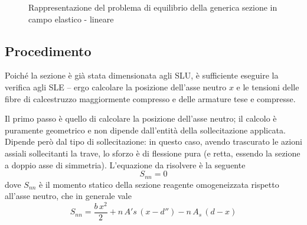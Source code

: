 \begin{figure}
{}
	\caption{Rappresentazione del problema di equilibrio della generica sezione in campo elastico - lineare}
	\label{fig:equilibrioSezioneSLE}
\end{figure}

\subsection{Procedimento}
Poiché la sezione è già stata dimensionata agli SLU, è sufficiente eseguire la verifica agli SLE -- ergo calcolare la posizione dell'asse neutro $x$ e le tensioni delle fibre di calcestruzzo maggiormente compresso e delle armature tese e compresse.

Il primo passo è quello di calcolare la posizione dell'asse neutro; il calcolo è puramente geometrico e non dipende dall'entità della sollecitazione applicata. Dipende però dal tipo di sollecitazione: in questo caso, avendo trascurato le azioni assiali sollecitanti la trave, lo sforzo è di flessione pura (e retta, essendo la sezione a doppio asse di simmetria). L'equazione da risolvere è la seguente
\begin{equation}
	\label{eq:Snn}
	S_{nn} = 0
\end{equation}
dove $S_{nn}$ è il momento statico della sezione reagente omogeneizzata rispetto all'asse neutro, che in generale vale
\[
S_{nn} = \dfrac{b\,x^2}{2} + n\,A's\,\left(x-d''\right) - n\,A_s\,\left(d - x\right)
\]

